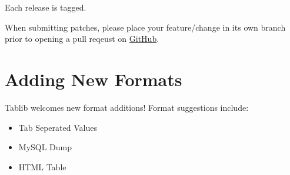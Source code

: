 \documentclass[a4paper,12pt,english]{sphinxmanual}
\begin{document}
Each release is tagged.

When submitting patches, please place your feature/change in its own branch prior to opening a pull reqeust on \href{http://github.com/kennethreitz/tablib/}{GitHub}.


\section{Adding New Formats}
\label{development:newformats}\label{development:adding-new-formats}
Tablib welcomes new format additions! Format suggestions include:
\begin{itemize}
\item {} 
Tab Seperated Values

\item {} 
MySQL Dump

\item {} 
HTML Table

\end{itemize}
\end{document}
